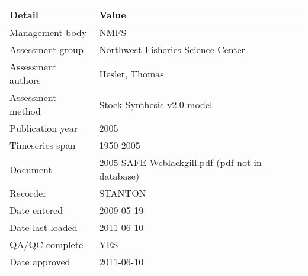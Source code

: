 \begin{table}[htb]
\centering
\begin{tabular}{lp{7cm}}
\toprule
Detail & Value \\
\midrule
Management body    & NMFS                                            \\
Assessment group   & Northwest Fisheries Science Center              \\
Assessment authors & Hesler, Thomas                                  \\
Assessment method  & Stock Synthesis v2.0 model                      \\
Publication year   & 2005                                            \\
Timeseries span    & 1950-2005                                       \\
Document           & 2005-SAFE-Wcblackgill.pdf (pdf not in database) \\
Recorder           & STANTON                                         \\
Date entered       & 2009-05-19                                      \\
Date last loaded   & 2011-06-10                                      \\
QA/QC complete     & YES                                             \\
Date approved      & 2011-06-10                                      \\
\bottomrule
\end{tabular}
\label{tab:assessdet}
\end{table}
